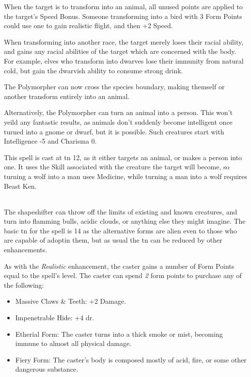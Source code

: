 \begin{multicols}{2}
\begin{itemize}
\end{itemize}

When the target is to transform into an animal, all unused points are applied to the target's Speed Bonus.  Someone transforming into a bird with 3 Form Points could use one to gain realistic flight, and then +2 Speed.

When transforming into another race, the target merely loses their racial ability, and gains any racial abilities of the target which are concerned with the body.  For example, elves who transform into dwarves lose their immunity from natural cold, but gain the dwarvish ability to consume strong drink.


The Polymorpher can now cross the species boundary, making themself or another transform entirely into an animal.

Alternatively, the Polymorpher can turn an animal into a person.
This won't yeild any fantastic results, as animals don't suddenly become intelligent once turned into a gnome or dwarf, but it is possible.
Such creatures start with Intelligence -5 and Charisma 0.

This spell is cast at \gls{tn} 12, as it either targets an animal, or makes a person into one.  It uses the Skill associated with the creature the target will become, so turning a wolf into a man uses Medicine, while turning a man into a wolf requires Beast Ken.

\spelllevel

\\
The shapeshifter can throw off the limits of existing and known creatures, and turn into flamming bulls, acidic clouds, or anything else they might imagine.  The basic \gls{tn} for the spell is 14 as the alternative forms are alien even to those who are capable of adoptin them, but as usual the \gls{tn} can be reduced by other enhancements.

As with the \textit{Realistic} enhancement, the caster gains a number of Form Points equal to the spell's level.  The caster can spend \textit{2} form points to purchase any of the following:

\begin{itemize}

	\item{Massive Claws \& Teeth: +2 Damage.}
	\item{Impenetrable Hide: +4 \gls{dr}.}
	\item{Etherial Form: The caster turns into a thick smoke or mist, becoming immune to almost all physical damage.}
	\item{Fiery Form: The caster's body is composed mostly of acid, fire, or some other dangerous substance.  }

\end{itemize}

\end{multicols}


